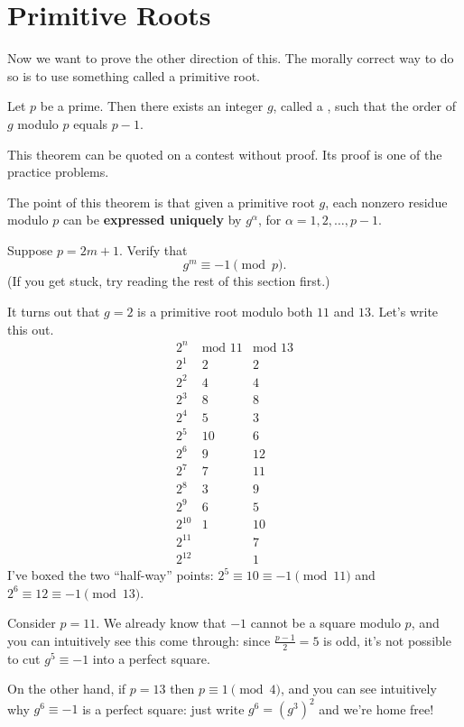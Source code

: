 \documentclass[11pt]{scrartcl}
\begin{document}
\section{Primitive Roots}
Now we want to prove the other direction of this.
The morally correct way to do so is to use something called a primitive root.

\begin{theorem}
  Let $p$ be a prime.
  Then there exists an integer $g$, called a ,
  such that the order of $g$ modulo $p$ equals $p-1$.
\end{theorem}
This theorem can be quoted on a contest without proof.
Its proof is one of the practice problems.

The point of this theorem is that given a primitive root $g$,
each nonzero residue modulo $p$ can be \textbf{expressed uniquely} by $g^\alpha$,
for $\alpha = 1, 2, \dots, p-1$.

\begin{exercise}
  Suppose $p = 2m+1$.
  Verify that \[ g^{m} \equiv -1 \pmod p. \]
  (If you get stuck, try reading the rest of this section first.)
\end{exercise}

\begin{example}
It turns out that $g=2$ is a primitive root modulo both $11$ and $13$.
Let's write this out.
\[
  \begin{array}{r|rr}
    2^n & \text{mod $11$} & \text{mod $13$} \\ \hline
    2^1 & 2 & 2 \\
    2^2 & 4 & 4 \\
    2^3 & 8 & 8 \\
    2^4 & 5 & 3 \\
    2^5 & \boxed{10} & 6 \\
    2^6 & 9 & \boxed{12} \\
    2^7 & 7 & 11 \\
    2^8 & 3 & 9 \\
    2^9 & 6 & 5 \\
    2^{10} & 1 & 10 \\
    2^{11} &   & 7 \\
    2^{12} &   & 1
  \end{array}
\]
I've boxed the two ``half-way'' points: $2^5 \equiv 10 \equiv -1 \pmod{11}$
and $2^6 \equiv 12 \equiv -1 \pmod{13}$.

Consider $p=11$.
We already know that $-1$ cannot be a square modulo $p$,
and you can intuitively see this come through: since $\frac{p-1}{2}=5$ is odd,
it's not possible to cut $g^5 \equiv -1$ into a perfect square.

On the other hand, if $p=13$ then $p \equiv 1 \pmod 4$, and you can see intuitively why $g^6 \equiv -1$ is a perfect square: just write $g^6 = (g^3)^2$ and we're home free!
\end{example}
\end{document}
